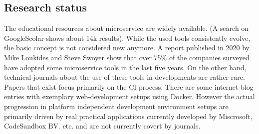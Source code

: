 \documentclass[12pt, a4paper]{article}
\begin{document}
\subsection{Research status}
The educational resources about microservice are widely available. (A search on GoogleScolar shows about 14k results). While the used tools consistently evolve, the basic concept is not considered new anymore. A report published in 2020 by Mike Loukides and Steve Swoyer show that over 75\% of the companies surveyed have adopted some microservice tools in the last five years.\cite{msadoption}
On the other hand, technical journals about the use of these tools in developments are rather rare. Papers that exist focus primarily on the \acl*{CI} process. There are some internet blog entries with exemplary web-development setups using Docker. However the actual progression in platform independent development environment setups are primarily driven by real practical applications currently developed by Miscrosoft, CodeSandbox BV. etc. and are not currently covert by journals.
\end{document}
